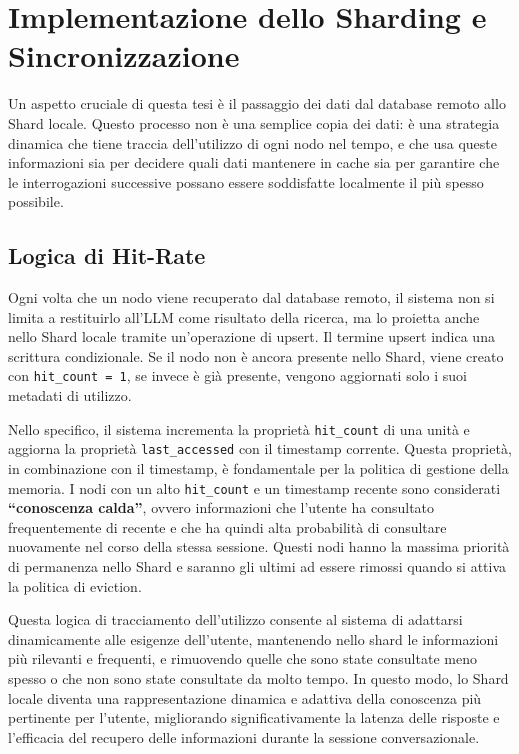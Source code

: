 \section{Implementazione dello Sharding e Sincronizzazione}

Un aspetto cruciale di questa tesi è il passaggio dei dati dal database remoto allo Shard locale. Questo processo non è una semplice copia dei dati: è una strategia dinamica che tiene traccia dell'utilizzo di ogni nodo nel tempo, e che usa queste informazioni sia per decidere quali dati mantenere in cache sia per garantire che le interrogazioni successive possano essere soddisfatte localmente il più spesso possibile.

\subsection{Logica di Hit-Rate}

Ogni volta che un nodo viene recuperato dal database remoto, il sistema non si limita a restituirlo all'LLM come risultato della ricerca, ma lo proietta anche nello Shard locale tramite un'operazione di upsert. Il termine upsert indica una scrittura condizionale. Se il nodo non è ancora presente nello Shard, viene creato con \texttt{hit\_count = 1}, se invece è già presente, vengono aggiornati solo i suoi metadati di utilizzo.

Nello specifico, il sistema incrementa la proprietà \texttt{hit\_count} di una unità e aggiorna la proprietà \texttt{last\_accessed} con il timestamp corrente. Questa proprietà, in combinazione con il timestamp, è fondamentale per la politica di gestione della memoria. I nodi con un alto \texttt{hit\_count} e un timestamp recente sono considerati \textbf{``conoscenza calda''}, ovvero informazioni che l'utente ha consultato frequentemente di recente e che ha quindi alta probabilità di consultare nuovamente nel corso della stessa sessione. Questi nodi hanno la massima priorità di permanenza nello Shard e saranno gli ultimi ad essere rimossi quando si attiva la politica di eviction.

Questa logica di tracciamento dell'utilizzo consente al sistema di adattarsi dinamicamente alle esigenze dell'utente, mantenendo nello shard le informazioni più rilevanti e frequenti, e rimuovendo quelle che sono state consultate meno spesso o che non sono state consultate da molto tempo. In questo modo, lo Shard locale diventa una rappresentazione dinamica e adattiva della conoscenza più pertinente per l'utente, migliorando significativamente la latenza delle risposte e l'efficacia del recupero delle informazioni durante la sessione conversazionale.

